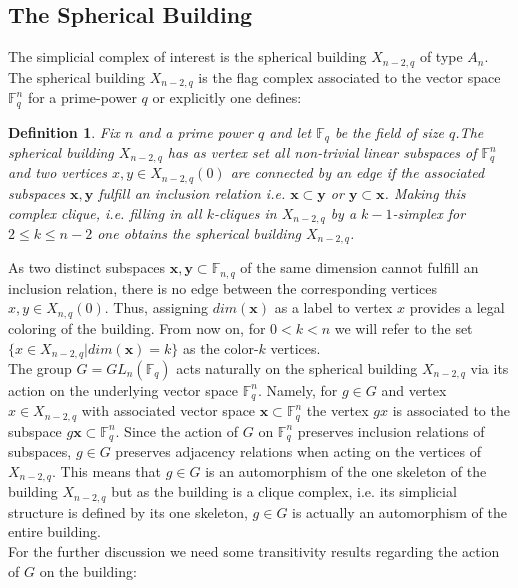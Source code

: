 \documentclass[11pt]{amsart}
\newtheorem{definition}[theorem]{Definition}
\begin{document}
    \subsection{The Spherical Building}
    \label{sec:SphericalBuilding}
     The simplicial complex of interest is the spherical building $X_{n-2,q}$ of type $A_n$. The spherical building $X_{n-2,q}$ is the flag complex associated to the vector space $\mathbb{F}_q^n$ for a prime-power $q$ or explicitly one defines:
	\begin{definition}
		Fix $n$ and a prime power $q$ and let $\mathbb{F}_q$ be the field of size $q$.The spherical building $X_{n-2,q}$ has as vertex set all non-trivial linear subspaces of $\mathbb{F}_q^n$ and two vertices $x,y\in X_{n-2,q}(0)$ are connected by an edge if the associated subspaces $\mathbf{x},\mathbf{y}$ fulfill an inclusion relation i.e. $\mathbf{x}\subset \mathbf{y}$ or $\mathbf{y}\subset \mathbf{x}$. Making this complex clique, i.e. filling in all $k$-cliques in $X_{n-2,q}$ by a $k-1$-simplex for  $2\leq k\leq n-2$ one obtains the spherical building $X_{n-2,q}$.
		\label{def:SphericalBuilding}
    \end{definition}
    As two distinct subspaces $\mathbf{x}, \mathbf{y}\subset \mathbb{F}_{n,q}$ of the same dimension cannot fulfill an inclusion relation, there is no edge between the corresponding vertices $x,y\in X_{n,q}(0)$. Thus, assigning $dim(\mathbf{x})$ as a label to vertex $x$ provides a legal coloring of the building. From now on, for $0<k<n$ we will refer to the set $\{x\in X_{n-2,q}|dim(\mathbf{x})=k\}$ as the color-$k$ vertices. \\ 
    The group $G=GL_n(\mathbb{F}_q)$ acts naturally on the spherical building $X_{n-2,q}$ via its action on the underlying vector space $\mathbb{F}_q^n$. Namely, for $g\in G$ and vertex $x\in X_{n-2,q}$ with associated vector space $\mathbf{x}\subset \mathbb{F}_q^n$ the vertex $gx$ is associated to the subspace $g\mathbf{x}\subset \mathbb{F}_q^n$. Since the action of $G$ on $\mathbb{F}_q^n$ preserves inclusion relations of subspaces, $g\in G$ preserves adjacency relations when acting on the vertices of $X_{n-2,q}$. This means that $g\in G$ is an automorphism of the one skeleton of the building $X_{n-2,q}$ but as the building is a clique complex, i.e. its simplicial structure is defined by its one skeleton, $g\in G$ is actually an automorphism of the entire building.\\
    For the further discussion we need some transitivity results regarding the action of $G$ on the building:
\end{document}
